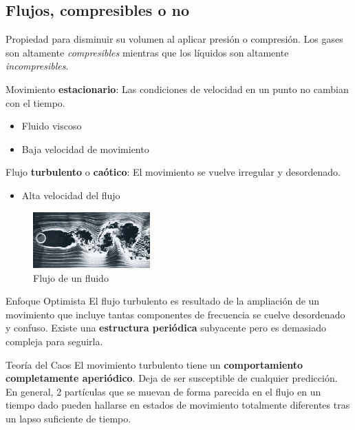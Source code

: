 \documentclass[8pt]{beamer}
\begin{document}
\subsection{Flujos, compresibles o no}
\begin{frame}
\begin{definition}
Propiedad para disminuir su volumen al aplicar presión o compresión. Los gases son altamente \emph{compresibles} mientras que los líquidos son altamente \emph{incompresibles}.
\end{definition}
\begin{block}{}
Movimiento \textbf{estacionario}: Las condiciones de velocidad en un punto no cambian con el tiempo.
\begin{itemize}
\item Fluido viscoso
\item Baja velocidad de movimiento
\end{itemize}
Flujo \textbf{turbulento} o \textbf{caótico}: El movimiento se vuelve irregular y desordenado.
\begin{itemize}
\item Alta velocidad del flujo
\end{itemize}
\end{block}
\begin{figure}[hbtp]
\centering
\includegraphics[width = 0.4\textwidth]{img/flujo_turb.jpg}
\caption{Flujo de un fluido}
\end{figure}
\end{frame}
\begin{frame}
\begin{block}{Enfoque Optimista}
El flujo turbulento es resultado de la ampliación de un movimiento que incluye tantas componentes de frecuencia se cuelve desordenado y confuso. Existe una \textbf{estructura periódica} subyacente pero es demasiado compleja para seguirla.
\end{block}
\begin{block}{Teoría del Caos}
El movimiento turbulento tiene un \textbf{comportamiento completamente aperiódico}. Deja de ser susceptible de cualquier predicción. En general, 2 partículas que se muevan de forma parecida en el flujo en un tiempo dado pueden hallarse en estados de movimiento totalmente diferentes tras un lapso suficiente de tiempo.
\end{block}
\end{frame}
\end{document}
